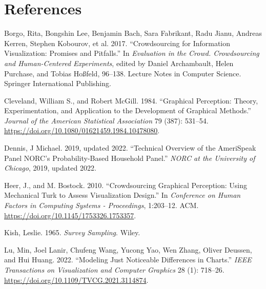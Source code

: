 \documentclass[
]{jds}
\newlength{\cslhangindent}
\newlength{\cslentryspacingunit} %
\newenvironment{CSLReferences}[2] %
 {%
  \setlength{\parindent}{0pt}
  \ifodd #1
  \let\oldpar\par
  \def\par{\hangindent=\cslhangindent\oldpar}
  \fi
  \setlength{\parskip}{#2\cslentryspacingunit}
 }%
 {}
\begin{document}
\hypertarget{references}{%
\section*{References}\label{references}}

\hypertarget{refs}{}
\begin{CSLReferences}{1}{0}
\leavevmode{}%
Borgo, Rita, Bongshin Lee, Benjamin Bach, Sara Fabrikant, Radu Jianu,
Andreas Kerren, Stephen Kobourov, et al. 2017. {``Crowdsourcing for
{Information Visualization}: {Promises} and {Pitfalls}.''} In
\emph{Evaluation in the {Crowd}. {Crowdsourcing} and {Human-Centered
Experiments}}, edited by Daniel Archambault, Helen Purchase, and Tobias
Hoßfeld, 96--138. Lecture {Notes} in {Computer Science}. {Springer
International Publishing}.

\leavevmode{}%
Cleveland, William S., and Robert McGill. 1984. {``Graphical Perception:
{Theory}, Experimentation, and Application to the Development of
Graphical Methods.''} \emph{Journal of the American Statistical
Association} 79 (387): 531--54.
\url{https://doi.org/10.1080/01621459.1984.10478080}.

\leavevmode{}%
Dennis, J Michael. 2019, updated 2022. {``Technical Overview of the
{AmeriSpeak} Panel {NORC}'s Probability-Based Household Panel.''}
\emph{NORC at the University of Chicago}, 2019, updated 2022.

\leavevmode{}%
Heer, J., and M. Bostock. 2010. {``Crowdsourcing Graphical Perception:
{Using} Mechanical {Turk} to Assess Visualization Design.''} In
\emph{Conference on {Human Factors} in {Computing Systems} -
{Proceedings}}, 1:203--12. {ACM}.
\url{https://doi.org/10.1145/1753326.1753357}.

\leavevmode{}%
Kish, Leslie. 1965. \emph{Survey {Sampling}}. {Wiley}.

\leavevmode{}%
Lu, Min, Joel Lanir, Chufeng Wang, Yucong Yao, Wen Zhang, Oliver
Deussen, and Hui Huang. 2022. {``Modeling {Just Noticeable Differences}
in {Charts}.''} \emph{IEEE Transactions on Visualization and Computer
Graphics} 28 (1): 718--26.
\url{https://doi.org/10.1109/TVCG.2021.3114874}.


\end{CSLReferences}
\end{document}
